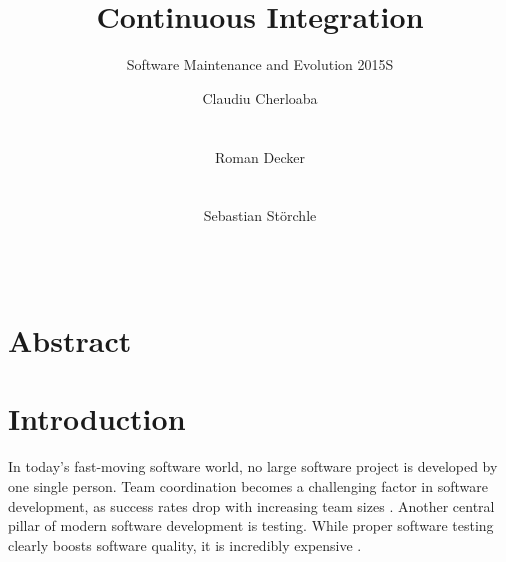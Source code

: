 \documentclass{sig-alternate}
\begin{document}
\title{Continuous Integration}
\subtitle{Software Maintenance and Evolution 2015S}



\author{
\alignauthor
Claudiu Cherloaba\\
       \\
       \\
\alignauthor
Roman Decker\\
       \\
       \\
\alignauthor
Sebastian Störchle\\
       \\
       \\
}

\maketitle

\section{Abstract}

\section{Introduction}

In today's fast-moving software world, no large software project is developed by
one single person. Team coordination becomes a challenging factor in software
development, as success rates drop with increasing team sizes
\cite{ambler:2010}. Another central pillar of modern software development is
testing. While proper software testing clearly boosts software quality, it is
incredibly expensive \cite{dustin:1999}.\\
\end{document}
